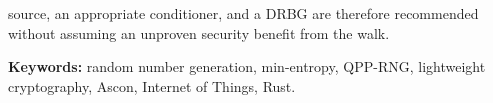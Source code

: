 \documentclass{plantilla-uniandes}
\begin{document}
source, an appropriate conditioner, and a DRBG are therefore recommended without assuming an unproven security benefit from the walk.

\textbf{Keywords:} random number generation, min-entropy, QPP-RNG, lightweight cryptography, Ascon, Internet of Things, Rust.
\endgroup

\cleardoublepage
\tableofcontents

\cleardoublepage
{}
\markboth{\listfigurename}{\listfigurename}
\listoffigures

\cleardoublepage
{}
\markboth{\listtablename}{\listtablename}
\listoftables



\mainmatter   %












\iniciarAnexos




\end{document}
